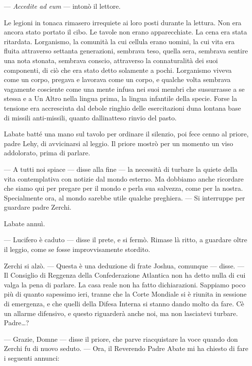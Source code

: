 --- \emph{Accedite ad eum} --- intonò il lettore.

Le legioni in tonaca rimasero irrequiete ai loro posti durante la
lettura. Non era ancora stato portato il cibo. Le tavole non erano
apparecchiate. La cena era stata ritardata. L\textquotesingle organismo,
la comunità la cui cellula erano uomini, la cui vita era fluita
attraverso settanta generazioni, sembrava teso, quella sera, sembrava
sentire una nota stonata, sembrava conscio, attraverso la connaturalità
dei suoi componenti, di ciò che era stato detto solamente a pochi.
L\textquotesingle organismo viveva come un corpo, pregava e lavorava
come un corpo, e qualche volta sembrava vagamente cosciente come una
mente infusa nei suoi membri che sussurrasse a se stessa e a Un Altro
nella lingua prima, la lingua infantile della specie. Forse la tensione
era accresciuta dal debole ringhio delle esercitazioni
d\textquotesingle una lontana base di missili anti-missili, quanto
dall\textquotesingle inatteso rinvio del pasto.

L\textquotesingle abate batté una mano sul tavolo per ordinare il
silenzio, poi fece cenno al priore, padre Lehy, di avvicinarsi al
leggio. Il priore mostrò per un momento un viso addolorato, prima di
parlare.

--- A tutti noi spiace --- disse alla fine --- la necessità di turbare
la quiete della vita contemplativa con notizie dal mondo esterno. Ma
dobbiamo anche ricordare che siamo qui per pregare per il mondo e perla
sua salvezza, come per la nostra. Specialmente ora, al mondo sarebbe
utile qualche preghiera. --- Si interruppe per guardare padre Zerchi.

L\textquotesingle abate annuì.

--- Lucifero è caduto --- disse il prete, e si fermò. Rimase là ritto, a
guardare oltre il leggio, come se fosse improvvisamente stordito.

Zerchi si alzò. --- Questa è una deduzione di frate Joshua, comunque ---
disse. --- Il Consiglio di Reggenza della Confederazione Atlantica non
ha detto nulla di cui valga la pena di parlare. La casa reale non ha
fatto dichiarazioni. Sappiamo poco più di quanto sapessimo ieri, tranne
che la Corte Mondiale si è riunita in sessione di emergenza, e che
quelli della Difesa Interna si stanno dando molto da fare.
C\textquotesingle è un allarme difensivo, e questo riguarderà anche noi,
ma non lasciatevi turbare. Padre\ldots?

--- Grazie, Domne --- disse il priore, che parve riacquistare la voce
quando don Zerchi fu di nuovo seduto. --- Ora, il Reverendo Padre Abate
mi ha chiesto di fare i seguenti annunci:

